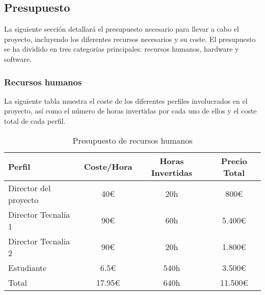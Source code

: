 
\pagebreak
\subsection{Presupuesto}
La siguiente sección detallará el presupuesto necesario para llevar a cabo el
proyecto, incluyendo los diferentes recursos necesarios y su coste. El
presupuesto se ha dividido en tres categorías principales: recursos humanos,
hardware y software.

\subsubsection{Recursos humanos}
La siguiente tabla muestra el coste de los diferentes perfiles involucrados en
el proyecto, así como el número de horas invertidas por cada uno de ellos y el
coste total de cada perfil.

\begin{table}[ht]
    \centering
    \begin{tabular}[ht]{l|c|c|c}
        \textbf{Perfil}       & \textbf{Coste/Hora} & \textbf{Horas Invertidas} & \textbf{Precio Total} \\
        \hline
        Director del proyecto & 40\euro             & 20h                       & 800\euro              \\
        Director Tecnalia 1   & 90\euro             & 60h                       & 5.400\euro            \\
        Director Tecnalia 2   & 90\euro             & 20h                       & 1.800\euro            \\
        Estudiante            & 6.5\euro            & 540h                      & 3.500\euro            \\
        \hline
        Total                 & 17.95\euro           & 640h                      & 11.500\euro           \\
    \end{tabular}
    \caption{Presupuesto de recursos humanos}\label{tab:huma-resources}
\end{table}

